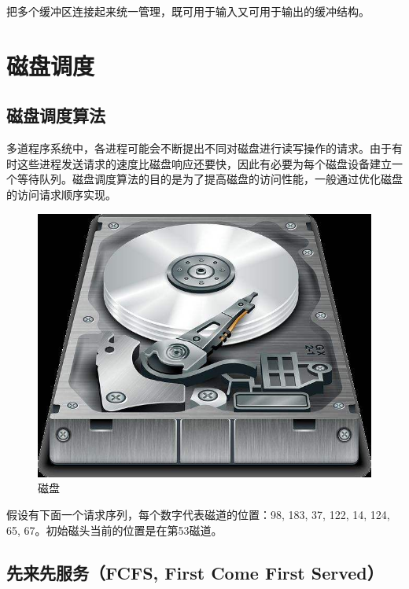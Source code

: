 把多个缓冲区连接起来统一管理，既可用于输入又可用于输出的缓冲结构。

\newpage

\section{磁盘调度}

\subsection{磁盘调度算法}

多道程序系统中，各进程可能会不断提出不同对磁盘进行读写操作的请求。由于有时这些进程发送请求的速度比磁盘响应还要快，因此有必要为每个磁盘设备建立一个等待队列。磁盘调度算法的目的是为了提高磁盘的访问性能，一般通过优化磁盘的访问请求顺序实现。

\begin{figure}[H]
	\centering
	\includegraphics[scale=0.5]{img/C4/4-4/1.png}
	\caption{磁盘}
\end{figure}

假设有下面一个请求序列，每个数字代表磁道的位置：98, 183, 37, 122, 14, 124, 65, 67。初始磁头当前的位置是在第53磁道。\\

\subsection{先来先服务（FCFS, First Come First Served）}

